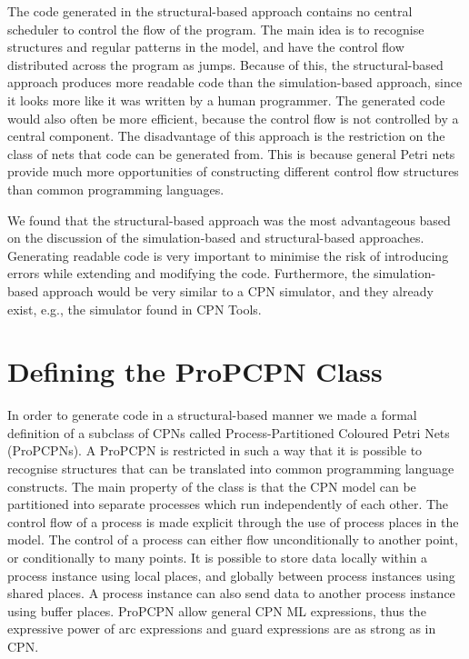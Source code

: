 The code generated in the structural-based approach contains no central scheduler to control the flow of the program. The main idea is to recognise structures and regular patterns in the model, and have the control flow distributed across the program as jumps. Because of this, the structural-based approach produces more readable code than the simulation-based approach, since it looks more like it was written by a human programmer. The generated code would also often be more efficient, because the control flow is not controlled by a central component. The disadvantage of this approach is the restriction on the class of nets that code can be generated from. This is because general Petri nets provide much more opportunities of constructing different control flow structures than common programming languages.

We found that the structural-based approach was the most advantageous based on the discussion of the simulation-based and structural-based approaches. Generating readable code is very important to minimise the risk of introducing errors while extending and modifying the code. Furthermore, the simulation-based approach would be very similar to a CPN simulator, and they already exist, e.g., the simulator found in CPN Tools.

\section{Defining the ProPCPN Class}
In order to generate code in a structural-based manner we made a formal definition of a subclass of CPNs called Process-Partitioned Coloured Petri Nets (ProPCPNs). A ProPCPN is restricted in such a way that it is possible to recognise structures that can be translated into common programming language constructs. The main property of the class is that the CPN model can be partitioned into separate processes which run independently of each other. The control flow of a process is made explicit through the use of process places in the model. The control of a process can either flow unconditionally to another point, or conditionally to many points. It is possible to store data locally within a process instance using local places, and globally between process instances using shared places. A process instance can also send data to another process instance using buffer places. ProPCPN allow general CPN ML expressions, thus the expressive power of arc expressions and guard expressions are as strong as in CPN. 
   
